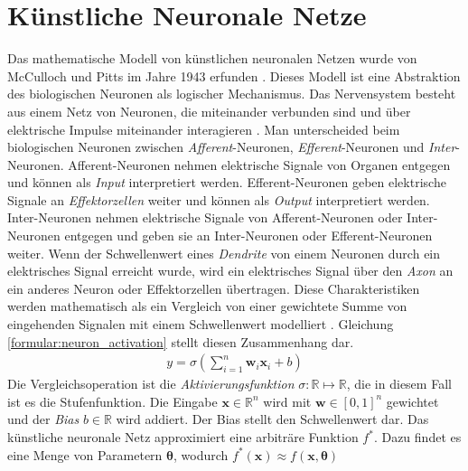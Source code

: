 \chapter{Künstliche Neuronale Netze}
Das mathematische Modell von künstlichen neuronalen Netzen wurde von McCulloch und Pitts im Jahre 1943 erfunden \cite{mcculloch1943logical}.
Dieses Modell ist eine Abstraktion des biologischen Neuronen als logischer Mechanismus.
\newline
\newline
Das Nervensystem besteht aus einem Netz von Neuronen, die miteinander verbunden sind und über elektrische Impulse miteinander interagieren \cite{rosenblatt1961principles}.
Man unterscheided beim biologischen Neuronen zwischen \textit{Afferent}-Neuronen, \textit{Efferent}-Neuronen und \textit{Inter}-Neuronen.
Afferent-Neuronen nehmen elektrische Signale von Organen entgegen und können als \textit{Input} interpretiert werden.
Efferent-Neuronen geben elektrische Signale an \textit{Effektorzellen} weiter und können als \textit{Output} interpretiert werden.
Inter-Neuronen nehmen elektrische Signale von Afferent-Neuronen oder Inter-Neuronen entgegen und geben sie an Inter-Neuronen oder Efferent-Neuronen weiter.
Wenn der Schwellenwert eines \textit{Dendrite} von einem Neuronen durch ein elektrisches Signal erreicht wurde, wird ein elektrisches Signal über den \textit{Axon} an ein
anderes Neuron oder Effektorzellen übertragen.
\newline
\newline
Diese Charakteristiken werden mathematisch als ein Vergleich von einer gewichtete Summe von eingehenden Signalen mit einem Schwellenwert modelliert \cite{higham2019deep}.
Gleichung \ref{formular:neuron_activation} stellt diesen Zusammenhang dar.
\begin{align}
    \label{formular:neuron_activation}
    y = \sigma(\sum_{i=1}^n\textbf{w}_i\textbf{x}_i + b)
\end{align}
Die Vergleichsoperation ist die \textit{Aktivierungsfunktion} $\sigma: \mathbb{R}\mapsto\mathbb{R}$, die in diesem Fall ist es die Stufenfunktion.
Die Eingabe $\textbf{x}\in\mathbb{R}^n$ wird mit $\textbf{w}\in[0, 1]^n$ gewichtet und der \textit{Bias} $b\in\mathbb{R}$ wird addiert. Der Bias stellt den Schwellenwert dar.
\newline
\newline
Das künstliche neuronale Netz approximiert eine arbiträre Funktion $f^*$. Dazu findet es eine Menge von Parametern $\boldsymbol\theta$, wodurch $f^*(\textbf{x})\approx f(\textbf{x}, \boldsymbol\theta)$
